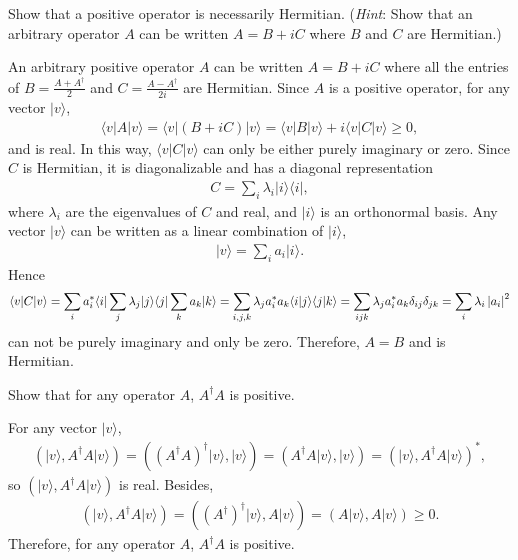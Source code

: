 \documentclass[en]{sol-man}
\begin{document}
\begin{exe}
    Show that a positive operator is necessarily Hermitian. (\emph{Hint}: Show that an arbitrary operator $A$ can be written $A=B+iC$ where $B$ and $C$ are Hermitian.)
\end{exe}
\begin{pf}
    An arbitrary positive operator $A$ can be written $A=B+iC$ where all the entries of $B=\frac{A+A^{\dagger}}{2}$ and $C=\frac{A-A^{\dagger}}{2i}$ are Hermitian. Since $A$ is a positive operator, for any vector $\lvert v\rangle$,
    \begin{align}
        \langle v\rvert A\lvert v\rangle=\langle v\rvert(B+iC)\lvert v\rangle=\langle v\rvert B\lvert v\rangle+i\langle v\rvert C\lvert v\rangle\geq 0,
    \end{align}
    and is real. In this way, $\langle v\rvert C\lvert v\rangle$ can only be either purely imaginary or zero. Since $C$ is Hermitian, it is diagonalizable and has a diagonal representation
    \begin{align}
        C=\sum_i\lambda_i\lvert i\rangle\langle i\rvert,
    \end{align}
    where $\lambda_i$ are the eigenvalues of $C$ and real, and $\lvert i\rangle$ is an orthonormal basis. Any vector $\lvert v\rangle$ can be written as a linear combination of $\lvert i\rangle$,
    \begin{align}
        \lvert v\rangle=\sum_ia_i\lvert i\rangle.
    \end{align}
    Hence
    \begin{align}
        \langle v\rvert C\lvert v\rangle=\sum_ia_i^*\langle i\rvert \sum_j\lambda_j\lvert j\rangle\langle j\rvert\sum_ka_k\lvert k\rangle=\sum_{i,j,k}\lambda_ja_i^*a_k\langle i\vert j\rangle\langle j\vert k\rangle=\sum_{ijk}\lambda_ja_i^*a_k\delta_{ij}\delta_{jk}=\sum_i\lambda_i\left\lvert a_i\right\rvert^2
    \end{align}
    can not be purely imaginary and only be zero. Therefore, $A=B$ and is Hermitian.
\end{pf}

\begin{exe}
    Show that for any operator $A$, $A^{\dagger}A$ is positive.
\end{exe}
\begin{pf}
    For any vector $\lvert v\rangle$,
    \begin{align}
        (\lvert v\rangle,A^{\dagger}A\lvert v\rangle)=((A^{\dagger}A)^{\dagger}\lvert v\rangle,\lvert v\rangle)=(A^{\dagger}A\lvert v\rangle,\lvert v\rangle)=(\lvert v\rangle,A^{\dagger}A\lvert v\rangle)^*,
    \end{align}
    so $(\lvert v\rangle,A^{\dagger}A\lvert v\rangle)$ is real. Besides,
    \begin{align}
        (\lvert v\rangle,A^{\dagger}A\lvert v\rangle)=((A^{\dagger})^{\dagger}\lvert v\rangle,A\lvert v\rangle)=(A\lvert v\rangle,A\lvert v\rangle)\geq 0.
    \end{align}
    Therefore, for any operator $A$, $A^{\dagger}A$ is positive.
\end{pf}
\end{document}
